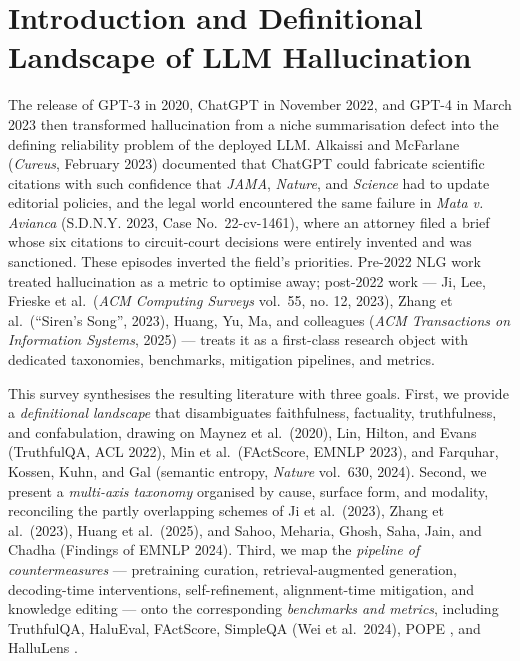 \documentclass{article}
\begin{document}
\section{Introduction and Definitional Landscape of LLM Hallucination}\label{introduction-and-definitional-landscape-of-llm-hallucination}

The release of GPT-3 in 2020, ChatGPT in November 2022, and GPT-4 in March 2023 then transformed hallucination from a niche summarisation defect into the defining reliability problem of the deployed LLM. Alkaissi and McFarlane (\emph{Cureus}, February 2023) documented that ChatGPT could fabricate scientific citations with such confidence that \emph{JAMA}, \emph{Nature}, and \emph{Science} had to update editorial policies, and the legal world encountered the same failure in \emph{Mata v. Avianca} (S.D.N.Y. 2023, Case No.~22-cv-1461), where an attorney filed a brief whose six citations to circuit-court decisions were entirely invented and was sanctioned. These episodes inverted the field's priorities. Pre-2022 NLG work treated hallucination as a metric to optimise away; post-2022 work --- Ji, Lee, Frieske et al.~(\emph{ACM Computing Surveys} vol.~55, no. 12, 2023), Zhang et al.~(``Siren's Song'', 2023), Huang, Yu, Ma, and colleagues (\emph{ACM Transactions on Information Systems}, 2025) --- treats it as a first-class research object with dedicated taxonomies, benchmarks, mitigation pipelines, and metrics.

This survey synthesises the resulting literature with three goals. First, we provide a \emph{definitional landscape} that disambiguates faithfulness, factuality, truthfulness, and confabulation, drawing on Maynez et al.~(2020), Lin, Hilton, and Evans (TruthfulQA, ACL 2022), Min et al.~(FActScore, EMNLP 2023), and Farquhar, Kossen, Kuhn, and Gal (semantic entropy, \emph{Nature} vol.~630, 2024). Second, we present a \emph{multi-axis taxonomy} organised by cause, surface form, and modality, reconciling the partly overlapping schemes of Ji et al.~(2023), Zhang et al.~(2023), Huang et al.~(2025), and Sahoo, Meharia, Ghosh, Saha, Jain, and Chadha (Findings of EMNLP 2024). Third, we map the \emph{pipeline of countermeasures} --- pretraining curation, retrieval-augmented generation, decoding-time interventions, self-refinement, alignment-time mitigation, and knowledge editing --- onto the corresponding \emph{benchmarks and metrics}, including TruthfulQA, HaluEval, FActScore, SimpleQA (Wei et al.~2024), POPE \citep{li2023haluevalalargescal}, and HalluLens \citep{bang2025hallulensllmhalluc}.
\end{document}
